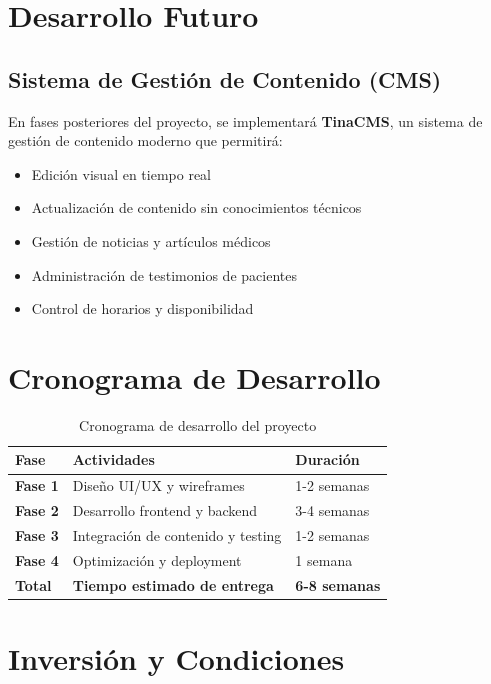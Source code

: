 \documentclass[12pt,a4paper]{article}
\begin{document}
\section{Desarrollo Futuro}

\subsection{Sistema de Gestión de Contenido (CMS)}
En fases posteriores del proyecto, se implementará \textbf{TinaCMS}, un sistema de gestión de contenido moderno que permitirá:

\begin{itemize}
    \item Edición visual en tiempo real
    \item Actualización de contenido sin conocimientos técnicos
    \item Gestión de noticias y artículos médicos
    \item Administración de testimonios de pacientes
    \item Control de horarios y disponibilidad
\end{itemize}

\section{Cronograma de Desarrollo}

\begin{table}[h]
\centering
\begin{tabularx}{\textwidth}{|l|X|l|}
\hline
\textbf{Fase} & \textbf{Actividades} & \textbf{Duración} \\
\hline
\textbf{Fase 1} & Diseño UI/UX y wireframes & 1-2 semanas \\
\hline
\textbf{Fase 2} & Desarrollo frontend y backend & 3-4 semanas \\
\hline
\textbf{Fase 3} & Integración de contenido y testing & 1-2 semanas \\
\hline
\textbf{Fase 4} & Optimización y deployment & 1 semana \\
\hline
\textbf{Total} & \textbf{Tiempo estimado de entrega} & \textbf{6-8 semanas} \\
\hline
\end{tabularx}
\caption{Cronograma de desarrollo del proyecto}
\end{table}

\section{Inversión y Condiciones}
\end{document}
